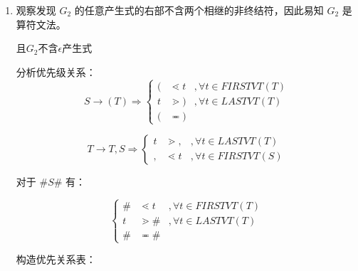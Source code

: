 \begin{enumerate}
\begin{enumerate}
        \item
        
        观察发现 $G_2$ 的任意产生式的右部不含两个相继的非终结符，因此易知 $G_2$ 是算符文法。
        
        且$G_2$不含$\epsilon$产生式
        
        分析优先级关系：
            $$
                S \to (T) \Rightarrow \left\{
                    \begin{array}{rll}
                        ( & \lessdot t & , \forall t \in FIRSTVT(T) \\
                        t & \gtrdot ) & , \forall t \in LASTVT(T) \\
                        ( & \eqcirc )
                    \end{array}
                \right.
            $$
            
            $$
                T \to T, S \Rightarrow \left\{
                    \begin{array}{rll}
                        t & \gtrdot , & , \forall t \in LASTVT(T) \\
                        , & \lessdot t & , \forall t \in FIRSTVT(S)
                    \end{array}
                \right.
            $$
            
            对于 $\#S\#$ 有：
            
            $$
                \left\{
                    \begin{array}{rll}
                        \# & \lessdot t & , \forall t \in FIRSTVT(T) \\
                        t & \gtrdot \# & , \forall t \in LASTVT(T) \\
                        \# & \eqcirc \# 
                    \end{array}
                \right.
            $$
            
            构造优先关系表：
            

\end{enumerate}
\end{enumerate}
